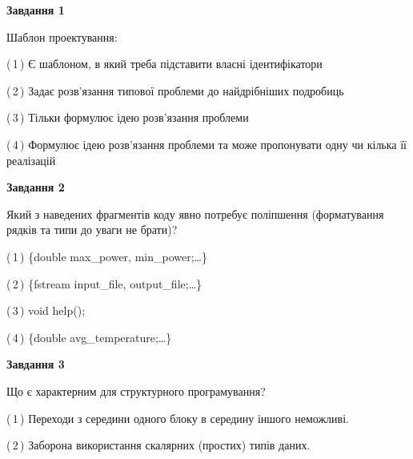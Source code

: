 \documentclass[10pt, ukrainian]{article}
\begin{document}
{
\begin {large}
{\begin {center}\textbf{Завдання 1}\end {center}}\par
Шаблон проектування:\par
\vspace{2mm}



(\,1\,) Є шаблоном, в який треба підставити власні ідентифікатори%



(\,2\,) Задає розв'язання типової проблеми до найдрібніших подробиць%



(\,3\,) Тільки формулює ідею розв'язання проблеми%



(\,4\,) Формулює ідею розв'язання проблеми та може пропонувати одну чи кілька її реалізацій%


{\begin {center}\textbf{Завдання 2}\end {center}}\par
Який з наведених фрагментів коду явно потребує поліпшення (форматування рядків та типи до уваги не брати)?\par
\vspace{2mm}



(\,1\,) \{double max\_power, min\_power;…\} %



(\,2\,) \{fstream input\_file, output\_file;…\} %



(\,3\,) void help();%



(\,4\,) \{double avg\_temperature;…\} %


{\begin {center}\textbf{Завдання 3}\end {center}}\par
Що є характерним для структурного програмування?\par
\vspace{2mm}



(\,1\,) Переходи з середини одного блоку в середину іншого неможливі. %



(\,2\,) Заборона використання скалярних (простих) типів даних. %




\end{large}}
\end{document}
